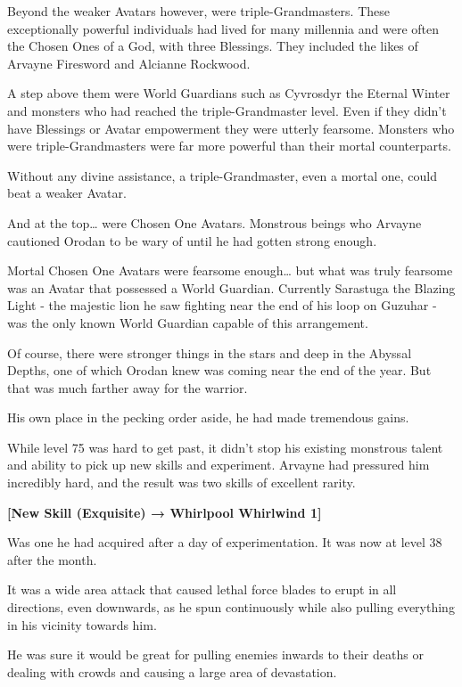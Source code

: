 \documentclass[a4paper,10pt]{book}
\begin{document}
Beyond the weaker Avatars however, were triple-Grandmasters. These exceptionally powerful individuals had lived for many millennia and were often the Chosen Ones of a God, with three Blessings. They included the likes of Arvayne Firesword and Alcianne Rockwood.\par
A step above them were World Guardians such as Cyvrosdyr the Eternal Winter and monsters who had reached the triple-Grandmaster level. Even if they didn’t have Blessings or Avatar empowerment they were utterly fearsome. Monsters who were triple-Grandmasters were far more powerful than their mortal counterparts.\par
Without any divine assistance, a triple-Grandmaster, even a mortal one, could beat a weaker Avatar.\par
And at the top… were Chosen One Avatars. Monstrous beings who Arvayne cautioned Orodan to be wary of until he had gotten strong enough.\par
Mortal Chosen One Avatars were fearsome enough… but what was truly fearsome was an Avatar that possessed a World Guardian. Currently Sarastuga the Blazing Light - the majestic lion he saw fighting near the end of his loop on Guzuhar - was the only known World Guardian capable of this arrangement.\par
Of course, there were stronger things in the stars and deep in the Abyssal Depths, one of which Orodan knew was coming near the end of the year. But that was much farther away for the warrior.\par
His own place in the pecking order aside, he had made tremendous gains.\par
While level 75 was hard to get past, it didn’t stop his existing monstrous talent and ability to pick up new skills and experiment. Arvayne had pressured him incredibly hard, and the result was two skills of excellent rarity.\par
\textbf{[New Skill (Exquisite) → Whirlpool Whirlwind 1]}\par
Was one he had acquired after a day of experimentation. It was now at level 38 after the month.\par
It was a wide area attack that caused lethal force blades to erupt in all directions, even downwards, as he spun continuously while also pulling everything in his vicinity towards him.\par
He was sure it would be great for pulling enemies inwards to their deaths or dealing with crowds and causing a large area of devastation.\par
\end{document}
